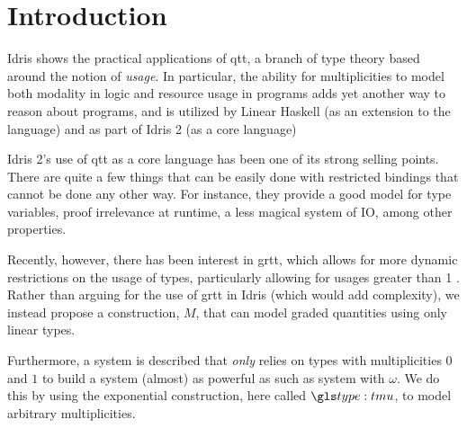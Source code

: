 \section{Introduction}

Idris shows the practical applications of \gls{qtt}, a branch of type theory based around the notion of \emph{usage}\cite{eb_idris_qtt_prac}.
In particular, the ability for multiplicities to model both modality in logic and resource usage in programs adds yet another way to reason about programs, and is utilized by Linear Haskell (as an extension to the language) and as part of Idris 2 (as a core language) \cite{eb_idris_qtt_prac, linear_haskell}

Idris 2's use of \gls{qtt} as a core language has been one of its strong selling points. 
There are quite a few things that can be easily done with restricted bindings that cannot be done any other way.
For instance, they provide a good model for type variables, proof irrelevance at runtime, a less magical system of IO, among other properties.

Recently, however, there has been interest in \gls{grtt}, which allows for more dynamic restrictions on the usage of types, particularly allowing for usages greater than 1 \cite{quant_graded_modal}.
Rather than arguing for the use of \gls{grtt} in Idris (which would add complexity), we instead propose a construction, $M$, that can model graded quantities using only linear types.

Furthermore, a system is described that \emph{only} relies on types with multiplicities $0$ and $1$ to build a system (almost) as powerful as such as system with $\omega$.
We do this by using the exponential construction, here called $\tmu$, to model arbitrary multiplicities.

